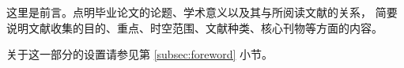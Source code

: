 \begin{foreword}
	这里是前言。点明毕业论文的论题、学术意义以及其与所阅读文献的关系，
	简要说明文献收集的目的、重点、时空范围、文献种类、核心刊物等方面的内容。

	关于这一部分的设置请参见第 \ref{subsec:foreword} 小节。
\end{foreword}

